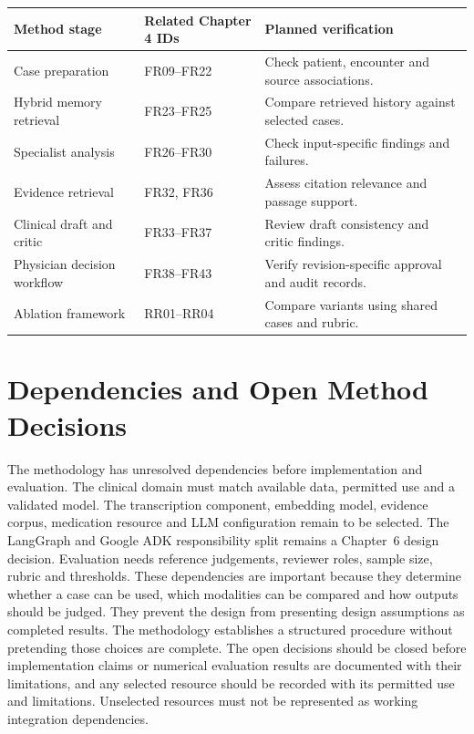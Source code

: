 \begin{reporttable}
\centering
\small
\caption{Traceability between methodology stages and current requirement areas.}
\label{tab:fatima:method-trace}
\begin{tabular}{|p{}|p{}|p{}|}
\hline
Method stage & Related Chapter 4 IDs & Planned verification \\ \hline
Case preparation & FR09--FR22 & Check patient, encounter and source associations. \\ \hline
Hybrid memory retrieval & FR23--FR25 & Compare retrieved history against selected cases. \\ \hline
Specialist analysis & FR26--FR30 & Check input-specific findings and failures. \\ \hline
Evidence retrieval & FR32, FR36 & Assess citation relevance and passage support. \\ \hline
Clinical draft and critic & FR33--FR37 & Review draft consistency and critic findings. \\ \hline
Physician decision workflow & FR38--FR43 & Verify revision-specific approval and audit records. \\ \hline
Ablation framework & RR01--RR04 & Compare variants using shared cases and rubric. \\ \hline
\end{tabular}
\end{reporttable}

\section{Dependencies and Open Method Decisions}

The methodology has unresolved dependencies before implementation and evaluation. The clinical domain must match available data, permitted use and a validated model. The transcription component, embedding model, evidence corpus, medication resource and LLM configuration remain to be selected. The LangGraph and Google ADK responsibility split remains a Chapter~6 design decision. Evaluation needs reference judgements, reviewer roles, sample size, rubric and thresholds. These dependencies are important because they determine whether a case can be used, which modalities can be compared and how outputs should be judged. They prevent the design from presenting design assumptions as completed results. The methodology establishes a structured procedure without pretending those choices are complete. The open decisions should be closed before implementation claims or numerical evaluation results are documented with their limitations, and any selected resource should be recorded with its permitted use and limitations. Unselected resources must not be represented as working integration dependencies.

